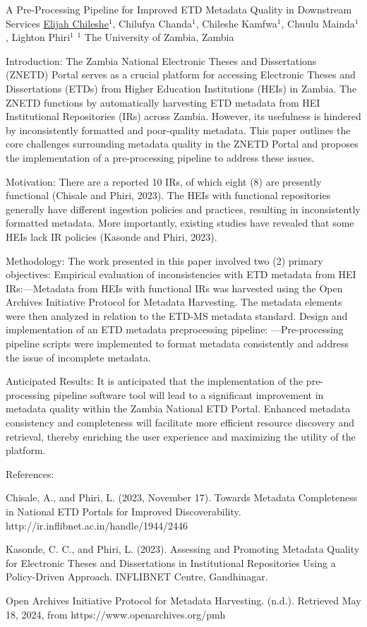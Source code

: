 
    \begin{abstract_online}{A Pre-Processing Pipeline for Improved ETD Metadata Quality in Downstream Services}{%
    \underline{Elijah Chileshe}$^{1}$, Chilufya Chanda$^{1}$, Chileshe Kamfwa$^{1}$, Chuulu Mainda$^{1}$, Lighton Phiri$^{1}$}{%
    }{%
    $^1$ The University of Zambia, Zambia
}

Introduction: The Zambia National Electronic Theses and Dissertations (ZNETD) Portal serves as a crucial platform for accessing Electronic Theses and Dissertations (ETDs) from Higher Education Institutions (HEIs) in Zambia. The ZNETD functions by automatically harvesting ETD metadata from HEI Institutional Repositories (IRs) across Zambia. However, its usefulness is hindered by inconsistently formatted and poor-quality metadata. This paper outlines the core challenges surrounding metadata quality in the ZNETD Portal and proposes the implementation of a pre-processing pipeline to address these issues.

Motivation: There are a reported 10 IRs, of which eight (8) are presently functional (Chisale and Phiri, 2023). The HEIs with functional repositories generally have different ingestion policies and practices, resulting in inconsistently formatted metadata. More importantly, existing studies have revealed that some HEIs lack IR policies (Kasonde and Phiri, 2023).

Methodology: The work presented in this paper involved two (2) primary objectives:
Empirical evaluation of inconsistencies with ETD metadata from HEI IRs:—Metadata from HEIs with functional IRs was harvested using the Open Archives Initiative Protocol for Metadata Harvesting. The metadata elements were then analyzed in relation to the ETD-MS metadata standard.
Design and implementation of an ETD metadata preprocessing pipeline: —Pre-processing pipeline scripts were implemented to format metadata consistently and address the issue of incomplete metadata.

Anticipated Results: It is anticipated that the implementation of the pre-processing pipeline software tool will lead to a significant improvement in metadata quality within the Zambia National ETD Portal. Enhanced metadata consistency and completeness will facilitate more efficient resource discovery and retrieval, thereby enriching the user experience and maximizing the utility of the platform.

References:

Chisale, A., and Phiri, L. (2023, November 17). Towards Metadata Completeness in National ETD Portals for Improved Discoverability. http://ir.inflibnet.ac.in/handle/1944/2446

Kasonde, C. C., and Phiri, L. (2023). Assessing and Promoting Metadata Quality for Electronic Theses and Dissertations in Institutional Repositories Using a Policy-Driven Approach. INFLIBNET Centre, Gandhinagar.

Open Archives Initiative Protocol for Metadata Harvesting. (n.d.). Retrieved May 18, 2024, from https://www.openarchives.org/pmh

\end{abstract_online}

